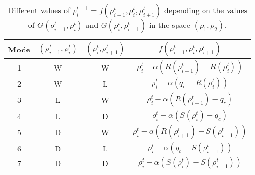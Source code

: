 \begin{table}[here]
\centering %
\begin{tabular}{c c c c} %
\hline\hline %
Mode & $(\rho^{t}_{i-1}, \rho^{t}_{i})$ & $(\rho^{t}_{i}, \rho^{t}_{i+1})$ & $f(\rho^{t}_{i-1},\rho^{t}_{i},\rho^{t}_{i+1})$ \\ [0.5ex]%
\hline %
1 & W & W & $\rho^{t}_{i} - \alpha(R(\rho^{t}_{i+1})-R(\rho^{t}_{i}))$ \\ [1ex]
2 & W & L & $\rho^{t}_{i} - \alpha(q_{c}-R(\rho^{t}_{i}))$ \\ [1ex]
3 & L & W & $\rho^{t}_{i} - \alpha(R(\rho^{t}_{i+1})-q_{c})$ \\ [1ex]
4 & L & D & $\rho^{t}_{i} - \alpha(S(\rho^{t}_{i})-q_{c})$ \\ [1ex]
5 & D & W & $\rho^{t}_{i} - \alpha(R(\rho^{t}_{i+1})-S(\rho^{t}_{i-1}))$ \\ [1ex]
6 & D & L & $\rho^{t}_{i} - \alpha(q_{c}-S(\rho^{t}_{i-1}))$ \\ [1ex]
7 & D & D & $\rho^{t}_{i} - \alpha(S(\rho^{t}_{i})-S(\rho^{t}_{i-1}))$ \\ [1ex]%
\hline %
\end{tabular}
\caption{Different values of $\rho^{t+1}_{i} = f(\rho^{t}_{i-1},\rho^{t}_{i},\rho^{t}_{i+1})$ depending on the values of $G(\rho^{t}_{i-1},\rho^{t}_{i})$ and $G(\rho^{t}_{i},\rho^{t}_{i+1})$ in the space $(\rho_{1},\rho_{2})$.}
\label{table:modes} %
\end{table}

